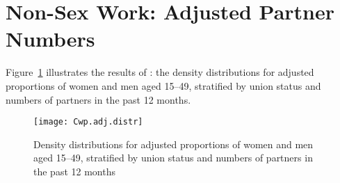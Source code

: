 \section{Non-Sex Work: Adjusted Partner Numbers}\label{app.model.nsw}
Figure~\ref{fig:Cwp.adj.dens} illustrates the results of :
the density distributions for adjusted proportions of women and men aged 15--49,
stratified by union status and numbers of partners in the past 12 months.
\begin{figure}[h]
  \centering
  \texttt{[image: Cwp.adj.distr]}
  \caption{Density distributions for adjusted proportions of women and men aged 15--49,
    stratified by union status and numbers of partners in the past 12 months}
  \label{fig:Cwp.adj.dens}
\end{figure}
\clearpage %
